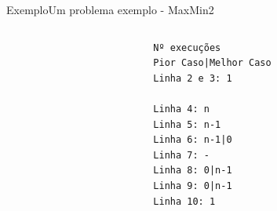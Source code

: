 \documentclass[aspectratio=169]{beamer}
\begin{document}
\begin{frame}[fragile]{Exemplo}{Um problema exemplo - MaxMin2}
\begin{columns}[T] %
\begin{column}{.68\textwidth}
\end{column}%
\hfill%
\begin{column}{.28\textwidth}
\begin{verbatim}
Nº execuções
Pior Caso|Melhor Caso
Linha 2 e 3: 1

Linha 4: n
Linha 5: n-1
Linha 6: n-1|0
Linha 7: -
Linha 8: 0|n-1
Linha 9: 0|n-1
Linha 10: 1
\end{verbatim}
\end{column}%
\end{columns}
\end{frame}
	
\end{document}
